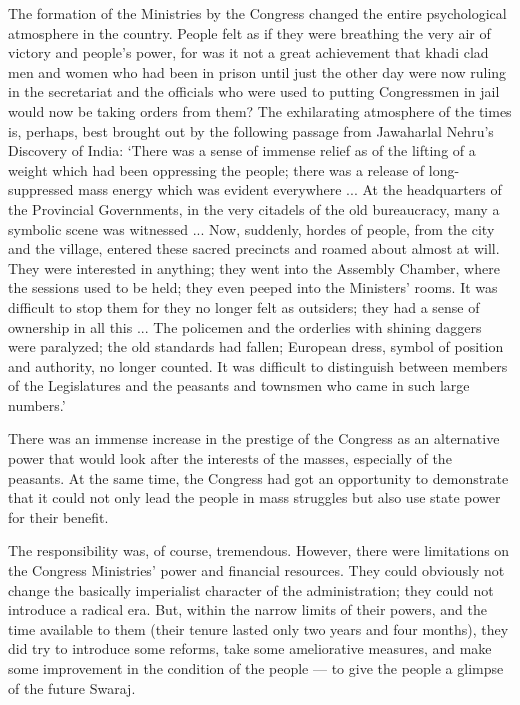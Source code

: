 \begin{multicols}{2}
The formation of the Ministries by the Congress changed the entire psychological atmosphere in the country. People felt as if they were breathing the very air of victory and people's power, for was it not a great achievement that khadi clad men and women who had been in prison until just the other day were now ruling in the secretariat and the officials who were used to putting Congressmen in jail would now be taking orders from them? The exhilarating atmosphere of the times is, perhaps, best brought out by the following passage from Jawaharlal Nehru's Discovery of India: `There was a sense of immense relief as of the lifting of a weight which had been oppressing the people; there was a release of long- suppressed mass energy which was evident everywhere ... At the headquarters of the Provincial Governments, in the very citadels of the old bureaucracy, many a symbolic scene was witnessed ... Now, suddenly, hordes of people, from the city and the village, entered these sacred precincts and roamed about almost at will. They were interested in anything; they went into the Assembly Chamber, where the sessions used to be held; they even peeped into the Ministers' rooms. It was difficult to stop them for they no longer felt as outsiders; they had a sense of ownership in all this ... The policemen and the orderlies with shining daggers were paralyzed; the old standards had fallen; European dress, symbol of position and authority, no longer counted. It was difficult to distinguish between members of the Legislatures and the peasants and townsmen who came in such large numbers.' 

There was an immense increase in the prestige of the Congress as an alternative power that would look after the interests of the masses, especially of the peasants. At the same time, the Congress had got an opportunity to demonstrate that it could not only lead the people in mass struggles but also use state power for their benefit. 

The responsibility was, of course, tremendous. However, there were limitations on the Congress Ministries' power and financial resources. They could obviously not change the basically imperialist character of the administration; they could not introduce a radical era. But, within the narrow limits of their powers, and the time available to them (their tenure lasted only two years and four months), they did try to introduce some reforms, take some ameliorative measures, and make some improvement in the condition of the people --- to give the people a glimpse of the future Swaraj. 


\end{multicols}
